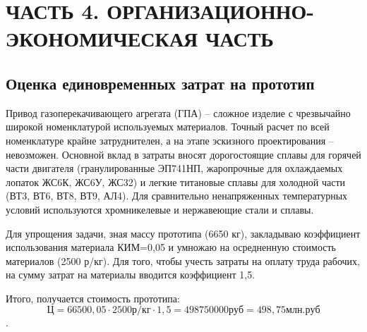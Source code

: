 \section{ЧАСТЬ 4. ОРГАНИЗАЦИОННО-ЭКОНОМИЧЕСКАЯ ЧАСТЬ}
\subsection{Оценка единовременных затрат на прототип}
Привод газоперекачивающего агрегата (ГПА) – сложное изделие с чрезвычайно широкой номенклатурой используемых материалов.
Точный расчет по всей номенклатуре крайне затруднителен, а на этапе эскизного проектирования – невозможен. Основной
вклад в затраты вносят дорогостоящие сплавы для горячей части двигателя (гранулированные ЭП741НП, жаропрочные для
охлаждаемых лопаток ЖС6К, ЖС6У, ЖС32) и легкие титановые сплавы для холодной части (ВТ3, ВТ6, ВТ8, ВТ9, АЛ4). Для
сравнительно ненапряженных температурных условий используются хромникелевые и нержавеющие стали и сплавы.

Для упрощения задачи, зная массу прототипа (6650 кг), закладываю коэффициент использования материала КИМ=0,05 и умножаю
на осредненную стоимость материалов (2500 р/кг). Для того, чтобы учесть затраты на оплату труда рабочих, на сумму затрат
на материалы вводится коэффициент 1,5.

Итого, получается стоимость прототипа:
$$
Ц = 66500,05 \cdot 2500 р/кг \cdot 1,5 = 498750000 руб = 498,75 млн.руб
$$.


